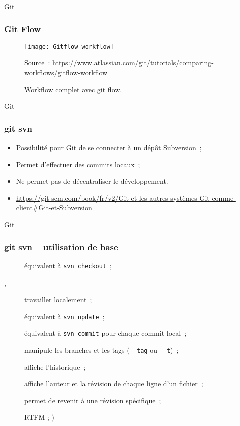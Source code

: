 \begin{frame}[fragile]{Git}
 \frametitle{Git Flow}
 \begin{figure}
   \caption{Workflow complet avec git flow.}
   \texttt{[image: Gitflow-workflow]}\par
   \tiny Source~: \url{https://www.atlassian.com/git/tutorials/comparing-workflows/gitflow-workflow}
 \end{figure}
\end{frame}

\begin{frame}[fragile]{Git}
\frametitle{git svn}
\begin{itemize}[<+->]
 \item Possibilité pour Git de se connecter à un dépôt Subversion~;
 \item Permet d'effectuer des commits locaux~;
 \item Ne permet pas de décentraliser le développement.
 \item \url{https://git-scm.com/book/fr/v2/Git-et-les-autres-systèmes-Git-comme-client#Git-et-Subversion}
\end{itemize}
\end{frame}

\begin{frame}[fragile]{Git}
\frametitle{git svn -- utilisation de base}
\begin{description}
 \item [] équivalent à \verb/svn checkout/~;
 \pause
 \item [, ] travailler localement~;
 \pause
 \item [] équivalent à \verb/svn update/~;
 \pause
 \item [] équivalent à \verb/svn commit/ pour chaque commit local~;
 \pause
 \item [] manipule les branches et les tags (\verb/--tag/ ou \verb/--t/)~;
 \pause
 \item [] affiche l'historique~;
 \pause
 \item [] affiche l'auteur et la révision de chaque ligne d'un fichier~;
 \pause
 \item [] permet de revenir à une révision spécifique~;
 \pause
 \item [] RTFM ;-)
\end{description}
\end{frame}

